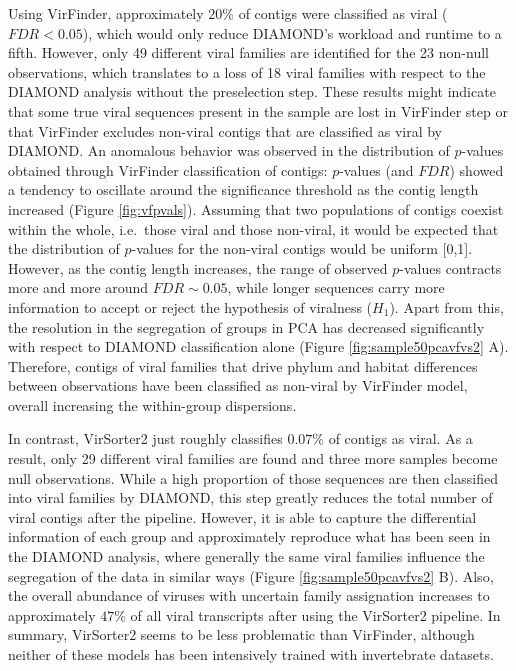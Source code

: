 \documentclass[
  openany]{book}
\begin{document}
Using VirFinder, approximately \(20\%\) of contigs were classified as viral (\(FDR < 0.05\)), which would only reduce DIAMOND's workload and runtime to a fifth. However, only 49 different viral families are identified for the 23 non-null observations, which translates to a loss of 18 viral families with respect to the DIAMOND analysis without the preselection step. These results might indicate that some true viral sequences present in the sample are lost in VirFinder step or that VirFinder excludes non-viral contigs that are classified as viral by DIAMOND. An anomalous behavior was observed in the distribution of \(p\)-values obtained through VirFinder classification of contigs: \(p\)-values (and \(FDR\)) showed a tendency to oscillate around the significance threshold as the contig length increased (Figure \ref{fig:vfpvals}). Assuming that two populations of contigs coexist within the whole, i.e.~those viral and those non-viral, it would be expected that the distribution of \(p\)-values for the non-viral contigs would be uniform {[}0,1{]}. However, as the contig length increases, the range of observed \(p\)-values contracts more and more around \(FDR \sim 0.05\), while longer sequences carry more information to accept or reject the hypothesis of viralness (\(H_1\)). Apart from this, the resolution in the segregation of groups in PCA has decreased significantly with respect to DIAMOND classification alone (Figure \ref{fig:sample50pcavfvs2} A). Therefore, contigs of viral families that drive phylum and habitat differences between observations have been classified as non-viral by VirFinder model, overall increasing the within-group dispersions.

In contrast, VirSorter2 just roughly classifies \(0.07\%\) of contigs as viral. As a result, only 29 different viral families are found and three more samples become null observations. While a high proportion of those sequences are then classified into viral families by DIAMOND, this step greatly reduces the total number of viral contigs after the pipeline. However, it is able to capture the differential information of each group and approximately reproduce what has been seen in the DIAMOND analysis, where generally the same viral families influence the segregation of the data in similar ways (Figure \ref{fig:sample50pcavfvs2} B). Also, the overall abundance of viruses with uncertain family assignation increases to approximately \(47\%\) of all viral transcripts after using the VirSorter2 pipeline. In summary, VirSorter2 seems to be less problematic than VirFinder, although neither of these models has been intensively trained with invertebrate datasets.
\end{document}

